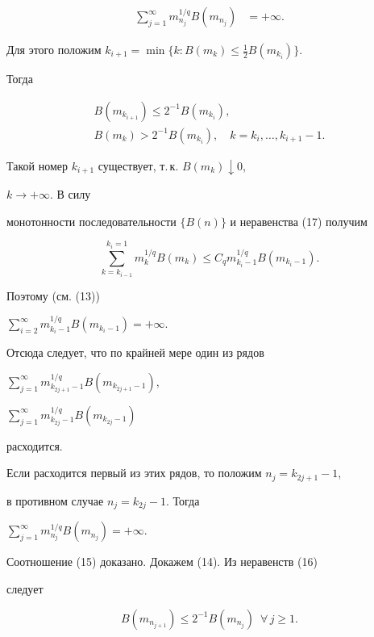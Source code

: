 \begin{pf}
\begin{align}
\sum^\infty_{j=1}m^{1/q}_{n_j}B(m_{n_j})&=+\infty. 


\end{align} 


Для этого положим $k_{i+1}=\min\{k:B(m_k)\le\frac{1}{2}B(m_{k_i})\}$. 


Тогда 


\begin{gather} 


B(m_{k_{i+1}})\le 2^{-1}B(m_{k_i}),\\ 


B(m_k)>2^{-1}B(m_{k_i}),\quad k=k_i,\dotsc,k_{i+1}-1. 


\end{gather} 


Такой номер $k_{i+1}$ существует, т.\,к. $B(m_k)\downarrow0$, 


$k\to+\infty$. В силу 


монотонности последовательности $\{B(n)\}$ и неравенства (17) получим 


\begin{equation} 


\sum^{k_i=1}_{k=k_{i-1}}m^{1/q}_k B(m_k)\le C_q 


m^{1/q}_{k_i-1}B(m_{k_i-1}). 


\end{equation} 


Поэтому (см. (13)) 


$\sum\limits^\infty_{i=2}m^{1/q}_{k_i-1}B(m_{k_i-1})=+\infty$. 


Отсюда следует, что по крайней мере один из рядов 


$\sum\limits^\infty_{j=1}m^{1/q}_{k_{2j+1}-1}B(m_{k_{2j+1}-1})$, 


$\sum\limits^\infty_{j=1}m^{1/q}_{k_{2j}-1}B(m_{k_{2j}-1})$ 


расходится. 


 


Если расходится первый из этих рядов, то положим $n_j=k_{2j+1}-1$, 


в противном случае $n_j=k_{2j}-1$. Тогда 


$\sum\limits^\infty_{j=1}m^{1/q}_{n_j}B(m_{n_j})=+\infty$. 


Соотношение (15) доказано. Докажем (14). Из неравенств (16) 


следует 


\begin{equation} 


B(m_{n_{j+1}})\le 2^{-1}B(m_{n_j})\ \; \forall\,j\ge1. 



\end{equation}
\end{pf}
